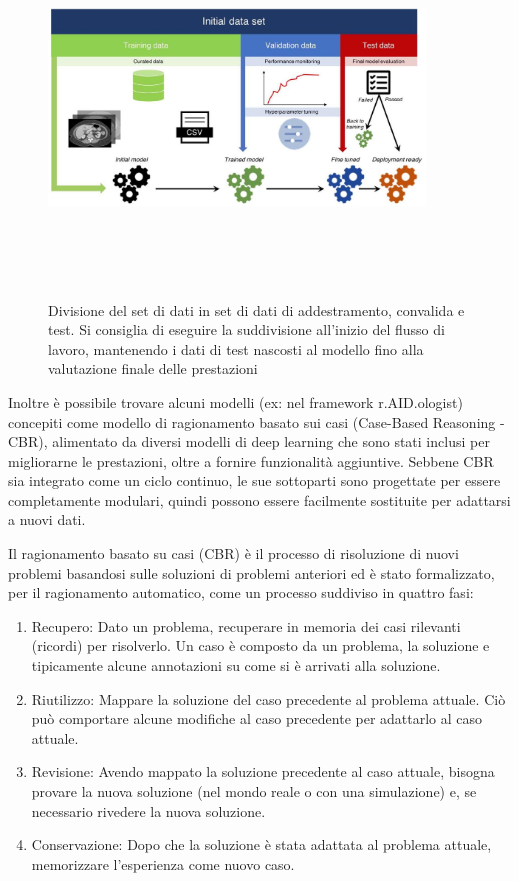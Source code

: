 \documentclass[12pt,a4paper]{report}
\begin{document}
\begin{figure}[h!]
    \begin{center}
        \includegraphics[width=10cm,height=10cm,keepaspectratio]{Data_radiology}
    \end{center}
    \caption{Divisione del set di dati in set di dati di addestramento, convalida e test. Si consiglia di eseguire la suddivisione all'inizio del flusso di lavoro, mantenendo i dati di test nascosti al modello fino alla valutazione finale delle prestazioni}
    \label{fig:data-sampling}
\end{figure}



Inoltre è possibile trovare alcuni modelli (ex: nel framework r.AID.ologist) concepiti come modello di ragionamento basato sui casi (Case-Based Reasoning - CBR), alimentato da diversi modelli di deep learning che sono stati inclusi per migliorarne le prestazioni, oltre a fornire funzionalità aggiuntive.
Sebbene CBR sia integrato come un ciclo continuo, le sue sottoparti sono progettate per essere completamente modulari, quindi possono essere facilmente sostituite per adattarsi a nuovi dati.

Il ragionamento basato su casi (CBR) è il processo di risoluzione di nuovi problemi basandosi sulle soluzioni di problemi anteriori ed è stato formalizzato, per il ragionamento automatico, come un processo suddiviso in quattro fasi:
\begin{enumerate}
\item Recupero: Dato un problema, recuperare in memoria dei casi rilevanti (ricordi) per risolverlo. Un caso è composto da un problema, la soluzione e tipicamente alcune annotazioni su come si è arrivati alla soluzione.
\item Riutilizzo: Mappare la soluzione del caso precedente al problema attuale. Ciò può comportare alcune modifiche al caso precedente per adattarlo al caso attuale.
\item Revisione: Avendo mappato la soluzione precedente al caso attuale, bisogna provare la nuova soluzione (nel mondo reale o con una simulazione) e, se necessario rivedere la nuova soluzione.
\item Conservazione: Dopo che la soluzione è stata adattata al problema attuale, memorizzare l'esperienza come nuovo caso.
\end{enumerate}
\end{document}
